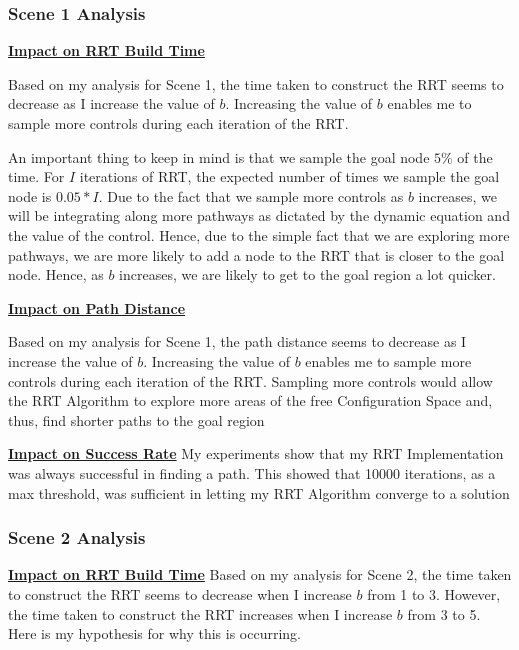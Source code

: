 \documentclass{article}
\begin{document}
\newpage 
\subsubsection{Scene 1 Analysis}

\textbf{\underline{Impact on RRT Build Time}} \newline

Based on my analysis for Scene 1, the time taken to construct the RRT seems to decrease as I increase the value of $b$. Increasing the value of $b$ enables me to sample more controls during each iteration of the RRT. \newline 

An important thing to keep in mind is that we sample the goal node $5\%$ of the time. For $I$ iterations of RRT, the expected number of times we sample the goal node is $0.05 * I$. Due to the fact that we sample more controls as $b$ increases, we will be integrating along more pathways as dictated by the dynamic equation and the value of the control. Hence, due to the simple fact that we are exploring more pathways, we are more likely to add a node to the RRT that is closer to the goal node. Hence, as $b$ increases, we are likely to get to the goal region a lot quicker. \newline 


\textbf{\underline{Impact on Path Distance}} \newline

Based on my analysis for Scene 1, the path distance seems to decrease as I increase the value of $b$. Increasing the value of $b$ enables me to sample more controls during each iteration of the RRT. Sampling more controls would allow the RRT Algorithm to explore more areas of the free Configuration Space and, thus, find shorter paths to the goal region \newline 


\textbf{\underline{Impact on Success Rate}} \newline
My experiments show that my RRT Implementation was always successful in finding a path. This showed that 10000 iterations, as a max threshold, was sufficient in letting my RRT Algorithm converge to a solution

\subsubsection{Scene 2 Analysis}

\textbf{\underline{Impact on RRT Build Time}} \newline
Based on my analysis for Scene 2, the time taken to construct the RRT seems to decrease when I increase $b$ from 1 to 3. However, the time taken to construct the RRT increases when I increase $b$ from 3 to 5. Here is my hypothesis for why this is occurring. \newline 
\end{document}
